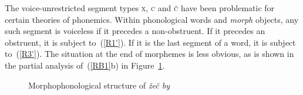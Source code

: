 \documentclass[output=paper]{langsci/langscibook}
\begin{document}
The voice-unrestricted segment types \textsc{x}, \textsc{c} and \textsc{\v{c}} have
been problematic for certain theories of phonemics. Within phonological
words and \textit{morph}\/ objects, any such segment is voiceless if it
precedes a non-obstruent.  If it precedes an obstruent, it is subject
to~(\ref{R1'}).  If it is the last segment of a word, it is subject
to~(\ref{R3'}). The situation at the end of morphemes is less obvious, as
is shown in the partial analysis of~(\ref{RB1}b) in Figure~\ref{zedzbi}.
\begin{figure}[t]
  \newsavebox{\tnhtwelf}
  \newsavebox{\tnhthirteen}
  \newsavebox{\tnhthfo}
  \newsavebox{\tnhfourteen}
  \caption{\label{zedzbi} Morphophonological structure of \emph{\v{z}e\v{c} by}}
\end{figure}
\end{document}
